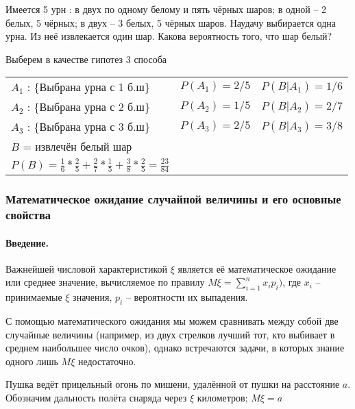 \documentclass[a4paper,12pt]{report}
\begin{document}
	
	 Имеется 5 урн : в двух по одному белому и пять чёрных шаров; в одной – 2 белых, 5 чёрных; в двух – 3 белых, 5 чёрных шаров. Наудачу выбирается одна урна. Из неё извлекается один шар. Какова вероятность того, что шар белый?

	 Выберем в качестве гипотез 3 способа \strut


	\begin{tabular}{ll@{\qquad}l}
	
		$A_1$ : \{Выбрана урна с 1 б.ш\} &  $P(A_1) = 2/5$ & $P(B|A_1) = 1/6$ \\
	
		$A_2$ : \{Выбрана урна с 2 б.ш\} & $P(A_2) = 1/5$ & $P(B|A_2) = 2/7$ \\
	
		$A_3$ : \{Выбрана урна с 3 б.ш\} & $P(A_3) = 2/5$ & $P(B|A_3) = 3/8$ \\
	
		$B$ = {извлечён белый шар} \qquad & & \\
		$P(B) = \frac{1}{6} * \frac{2}{5} + \frac{2}{7} * \frac{1}{5} + \frac{3}{8} * \frac{2}{5} = \frac{23}{84}$
	
	\end{tabular}





\subsubsection{Математическое ожидание случайной величины и его основные свойства}



	\paragraph{Введение.}

	Важнейшей числовой характеристикой $\xi$ является её математическое ожидание или среднее значение, вычисляемое по правилу $M\xi = \sum\limits^n_{i=1}x_ip_i)$, где $x_i$ – принимаемые $\xi$ значения, $p_i$ – вероятности их выпадения. 

	С помощью математического ожидания мы можем сравнивать между собой две случайные величины (например, из двух стрелков лучший тот, кто выбивает в среднем наибольшее число очков), однако встречаются задачи, в которых знание одного лишь $M\xi$ недостаточно. 


	 Пушка ведёт прицельный огонь по мишени, удалённой от пушки на расстояние $a$. Обозначим дальность полёта снаряда через $\xi$ километров; $M\xi = a$
\end{document}
